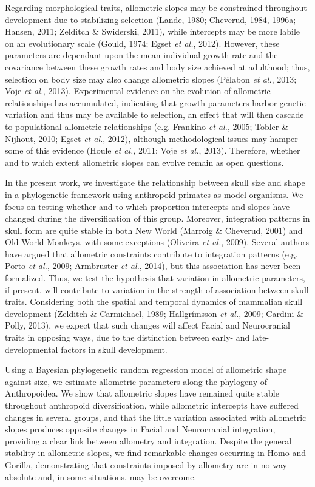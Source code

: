 \documentclass[12pt,]{article}
\begin{document}
Regarding morphological traits, allometric slopes may be constrained
throughout development due to stabilizing selection (Lande, 1980;
Cheverud, 1984, 1996a; Hansen, 2011; Zelditch \& Swiderski, 2011), while
intercepts may be more labile on an evolutionary scale (Gould, 1974;
Egset \emph{et al.}, 2012). However, these parameters are dependant upon
the mean individual growth rate and the covariance between these growth
rates and body size achieved at adulthood; thus, selection on body size
may also change allometric slopes (Pélabon \emph{et al.}, 2013; Voje
\emph{et al.}, 2013). Experimental evidence on the evolution of
allometric relationships has accumulated, indicating that growth
parameters harbor genetic variation and thus may be available to
selection, an effect that will then cascade to populational allometric
relationships (e.g. Frankino \emph{et al.}, 2005; Tobler \& Nijhout,
2010; Egset \emph{et al.}, 2012), although methodological issues may
hamper some of this evidence (Houle \emph{et al.}, 2011; Voje \emph{et
al.}, 2013). Therefore, whether and to which extent allometric slopes
can evolve remain as open questions.

In the present work, we investigate the relationship between skull size
and shape in a phylogenetic framework using anthropoid primates as model
organisms. We focus on testing whether and to which proportion
intercepts and slopes have changed during the diversification of this
group. Moreover, integration patterns in skull form are quite stable in
both New World (Marroig \& Cheverud, 2001) and Old World Monkeys, with
some exceptions (Oliveira \emph{et al.}, 2009). Several authors have
argued that allometric constraints contribute to integration patterns
(e.g. Porto \emph{et al.}, 2009; Armbruster \emph{et al.}, 2014), but
this association has never been formalized. Thus, we test the hypothesis
that variation in allometric parameters, if present, will contribute to
variation in the strength of association between skull traits.
Considering both the spatial and temporal dynamics of mammalian skull
development (Zelditch \& Carmichael, 1989; Hallgrímsson \emph{et al.},
2009; Cardini \& Polly, 2013), we expect that such changes will affect
Facial and Neurocranial traits in opposing ways, due to the distinction
between early- and late-developmental factors in skull development.

Using a Bayesian phylogenetic random regression model of allometric
shape against size, we estimate allometric parameters along the
phylogeny of Anthropoidea. We show that allometric slopes have remained
quite stable throughout anthropoid diversification, while allometric
intercepts have suffered changes in several groups, and that the little
variation associated with allometric slopes produces opposite changes in
Facial and Neurocranial integration, providing a clear link between
allometry and integration. Despite the general stability in allometric
slopes, we find remarkable changes occurring in Homo and Gorilla,
demonstrating that constraints imposed by allometry are in no way
absolute and, in some situations, may be overcome.
\end{document}
